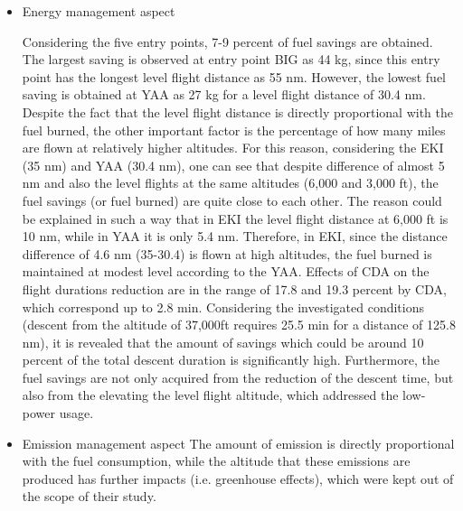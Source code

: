\documentclass{aer1315-pretty}
\begin{document}
\begin{itemize}
\begin{itemize}
\item Energy management aspect

Considering the five entry points, 7-9 percent of fuel savings are obtained. The largest saving is observed at entry point BIG as 44 kg, since this entry point has the longest level flight distance as 55 nm. However, the lowest fuel saving is obtained at YAA as 27 kg for a level flight distance of 30.4 nm. Despite the fact that the level flight distance is directly proportional with the fuel burned, the other important factor is the percentage of how many miles are flown at relatively higher altitudes. For this reason, considering the EKI (35 nm) and YAA (30.4 nm), one can see that despite difference of almost 5 nm and also the level flights at the same altitudes (6,000 and 3,000 ft), the fuel savings (or fuel burned) are quite close to each other. The reason could be explained in such a way that in EKI the level flight distance at 6,000 ft is 10 nm, while in YAA it is only 5.4 nm. Therefore, in EKI, since the distance difference of 4.6 nm (35-30.4) is flown at high altitudes, the fuel burned is maintained at modest level according to the YAA.
  Effects of CDA on the flight durations reduction are in the range of 17.8 and 19.3 percent by CDA, which correspond up to 2.8 min. Considering the investigated conditions (descent from the altitude of 37,000ft requires 25.5 min for a distance of 125.8 nm), it is revealed that the amount of savings which could be around 10 percent of the total descent duration is significantly high.  Furthermore, the fuel savings are not only acquired from the reduction of the descent time, but also from the elevating the level flight altitude, which addressed the low-power usage.

\item Emission management aspect
The amount of emission is directly proportional with the fuel consumption, while the altitude that these emissions are produced has further impacts (i.e. greenhouse effects), which were kept out of the scope of their study. 

\end{itemize}


\end{itemize}
\end{document}
